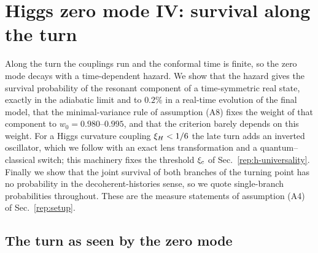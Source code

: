 \section{Higgs zero mode IV: survival along the turn}\label{rep:h-survival}

Along the turn the couplings run and the conformal time is finite, so the zero mode decays with a time-dependent hazard.
We show that the hazard gives the survival probability of the resonant component of a time-symmetric real state, exactly in the adiabatic limit and to $0.2\%$ in a real-time evolution of the final model, that the minimal-variance rule of assumption (A8) fixes the weight of that component to $w_0=0.980$--$0.995$, and that the criterion barely depends on this weight. %
For a Higgs curvature coupling $\xi_H<1/6$ the late turn adds an inverted oscillator, which we follow with an exact lens transformation and a quantum--classical switch; this machinery fixes the threshold $\xi_c$ of Sec.~\ref{rep:h-universality}.
Finally we show that the joint survival of both branches of the turning point has no probability in the decoherent-histories sense, so we quote single-branch probabilities throughout.
These are the measure statements of assumption (A4) of Sec.~\ref{rep:setup}.

\subsection{The turn as seen by the zero mode}
\label{sec:rb-turn}

